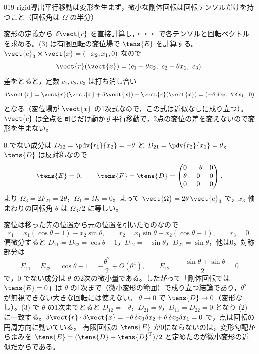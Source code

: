 \documentclass[uplatex,dvipdfmx,a4paper,11pt]{jsarticle}
\begin{document}
\begin{mondai}{019-rigid}{導出}{平行移動は変形を生まず，微小な剛体回転は回転テンソルだけを持つこと（回転角は $\Omega$ の半分）}
\begin{tadashii}
\houshin 変形の定義から $\delta\vect{r}$ を直接計算し，・・・ で各テンソルと回転ベクトルを求める。(3) は有限回転の変位場で $\tens{E}$ を計算する。
\keisan {} $\vect{e}_3\times\vect{x}=(-x_2,x_1,0)$ なので
\[ \vect{r}(\vect{x})=(c_1-\theta x_2,\ c_2+\theta x_1,\ c_3). \]
差をとると，定数 $c_1,c_2,c_3$ は打ち消し合い
\[ \delta\vect{r}=\vect{r}(\vect{x}+\delta\vect{x})-\vect{r}(\vect{x})=(-\theta\,\delta x_2,\ \theta\,\delta x_1,\ 0) \]
となる（変位場が $\vect{x}$ の1次式なので，この式は近似なしに成り立つ）。$\vect{c}$ は全点を同じだけ動かす平行移動で，2点の変位の差を変えないので変形を生まない。

 0 でない成分は $D_{12}=\pdv{r_1}{x_2}=-\theta$ と $D_{21}=\pdv{r_2}{x_1}=\theta$。$\tens{D}$ は反対称なので
\[ \tens{E}=0,\qquad \tens{F}=\tens{D}=\begin{pmatrix} 0 & -\theta & 0\\ \theta & 0 & 0\\ 0 & 0 & 0 \end{pmatrix}. \]
 より $\Omega_3=2F_{21}=2\theta$，$\Omega_1=\Omega_2=0$。よって $\vect{\Omega}=2\theta\,\vect{e}_3$ で，$x_3$ 軸まわりの回転角 $\theta$ は $\Omega_3/2$ に等しい。

 変位は移った先の位置から元の位置を引いたものなので
\[ r_1=x_1(\cos\theta-1)-x_2\sin\theta,\qquad r_2=x_1\sin\theta+x_2(\cos\theta-1),\qquad r_3=0. \]
偏微分すると $D_{11}=D_{22}=\cos\theta-1$，$D_{12}=-\sin\theta$，$D_{21}=\sin\theta$，他は0。対称部分は
\[ E_{11}=E_{22}=\cos\theta-1=-\frac{\theta^{2}}{2}+O(\theta^{4}),\qquad E_{12}=\frac{-\sin\theta+\sin\theta}{2}=0 \]
で，0 でない成分は $\theta$ の2次の微小量である。したがって「剛体回転では $\tens{E}=0$」は $\theta$ の1次まで（微小変形の範囲）で成り立つ結論であり，$\theta^{2}$ が無視できない大きな回転には使えない。
\kenzan $\theta\to0$ で $\tens{D}\to0$（変形なし）。(3) で $\theta$ の1次までとると $D_{12}=-\theta$，$D_{21}=\theta$，$D_{11}=D_{22}=0$ となり (2) に一致する。$\delta\vect{r}\cdot\delta\vect{x}=-\theta\,\delta x_1\delta x_2+\theta\,\delta x_2\delta x_1=0$ で，点は回転の円周方向に動いている。
\tsumazuki 有限回転の $\tens{E}$ が0にならないのは，変形勾配から歪みを $\tens{E}=(\tens{D}+\tens{D}^{\mathrm{T}})/2$ と定めたのが微小変形の近似だからである。
\end{tadashii}
\end{mondai}
\end{document}
